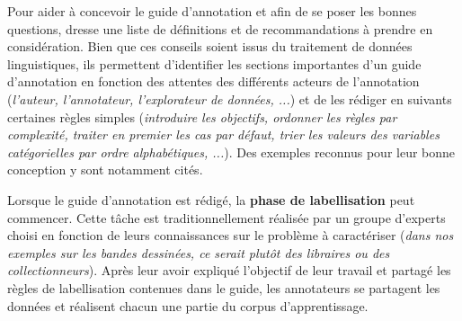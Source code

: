 			\begin{leftBarInformation}
				Pour aider à concevoir le guide d'annotation et afin de se poser les bonnes questions, \cite{dipper-etal:2004:useradaptive-annotation-guidelines} dresse une liste de définitions et de recommandations à prendre en considération.
				Bien que ces conseils soient issus du traitement de données linguistiques, ils permettent d'identifier les sections importantes d'un guide d'annotation en fonction des attentes des différents acteurs de l'annotation (\textit{l'auteur, l'annotateur, l'explorateur de données, ...}) et de les rédiger en suivants certaines règles simples (\textit{introduire les objectifs, ordonner les règles par complexité, traiter en premier les cas par défaut, trier les valeurs des variables catégorielles par ordre alphabétiques, ...}).
				Des exemples reconnus pour leur bonne conception y sont notamment cités.
			\end{leftBarInformation}
			
			
			
			Lorsque le guide d'annotation est rédigé, la \textbf{phase de labellisation} peut commencer.
			Cette tâche est traditionnellement réalisée par un groupe d'experts choisi en fonction de leurs connaissances sur le problème à caractériser (\textit{dans nos exemples sur les bandes dessinées, ce serait plutôt des libraires ou des collectionneurs}).
			Après leur avoir expliqué l'objectif de leur travail et partagé les règles de labellisation contenues dans le guide, les annotateurs se partagent les données et réalisent chacun une partie du corpus d'apprentissage.
			
			
